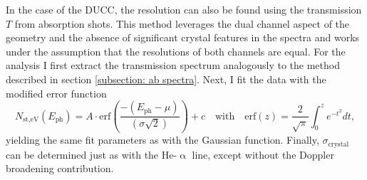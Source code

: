 In the case of the DUCC, the resolution can also be found using the transmission $T$ from absorption shots. This method leverages the dual channel aspect of the geometry and the absence of significant crystal features in the spectra and works under the assumption that the resolutions of both channels are equal. For the analysis I first extract the transmission spectrum analogously to the method described in section \ref{subsection: ab spectra}. Next, I fit the data with the modified error function
\begin{equation}
	N_{\text{st,eV}}(E_{\text{ph}}) = A\cdot\text{erf}\left(\frac{-(E_{\text{ph}}-\mu)}{(\sigma\sqrt{2})}\right)+c \quad\text{with}\quad \text{erf}(z) = \frac{2}{\sqrt{\pi}}\int_{0}^{z}e^{-t^2}dt,
\end{equation}
yielding the same fit parameters as with the Gaussian function. Finally, $\sigma_{\text{crystal}}$ can be determined just as with the He-$\upalpha$ line, except without the Doppler broadening contribution.

